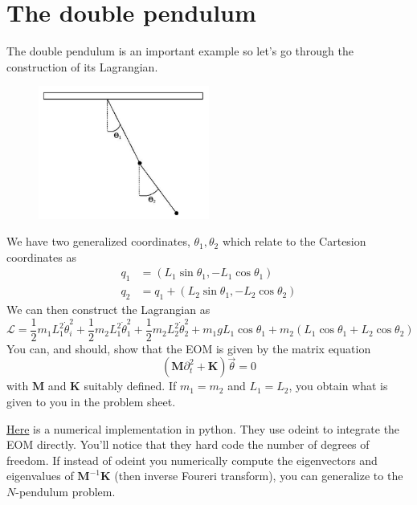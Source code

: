 \documentclass{article}
\theoremstyle{definition}
\theoremstyle{remark}
\theoremstyle{example}
\begin{document}
\section*{The double pendulum}

The double pendulum is an important example so let's go through the construction of its Lagrangian.

\begin{figure}[H]
  \centering
  \includegraphics[width=0.5\textwidth]{Capture.PNG}
\end{figure}
We have two generalized coordinates, $\theta_1,\theta_2$ which relate to the Cartesion coordinates as
\begin{align*}
  q_1 &= (L_1\sin\theta_1,-L_1\cos \theta_1)\\
  q_2 &= q_1+(L_2\sin\theta_1, -L_2\cos\theta_2)
\end{align*}
We can then construct the Lagrangian as 
$$
\mathcal L=\frac{1}{2}m_1L_1^2\dot\theta_i^2+\frac{1}{2}m_2L_1^2\dot\theta_1^2+\frac{1}{2}m_2L_2^2\dot\theta^2_2+m_1gL_1\cos\theta_1+m_2(L_1\cos\theta_1+L_2\cos\theta_2)
$$
You can, and should, show that the EOM is given by the matrix equation
$$
(\mathbf M\partial^2_t+\mathbf K)\vec\theta=0
$$
with $\mathbf M$ and $\mathbf K$ suitably defined. If $m_1=m_2$ and $L_1=L_2$, you obtain what is given to you in the problem sheet. 

\href{https://matplotlib.org/stable/gallery/animation/double_pendulum.html}{Here} is a numerical implementation in python. They use odeint to integrate the EOM directly. You'll notice that they hard code the number of degrees of freedom. If instead of odeint you numerically compute the eigenvectors and eigenvalues of $\mathbf M^{-1}\mathbf K$ (then inverse Foureri transform), you can generalize to the $N$-pendulum problem.   
\end{document}
